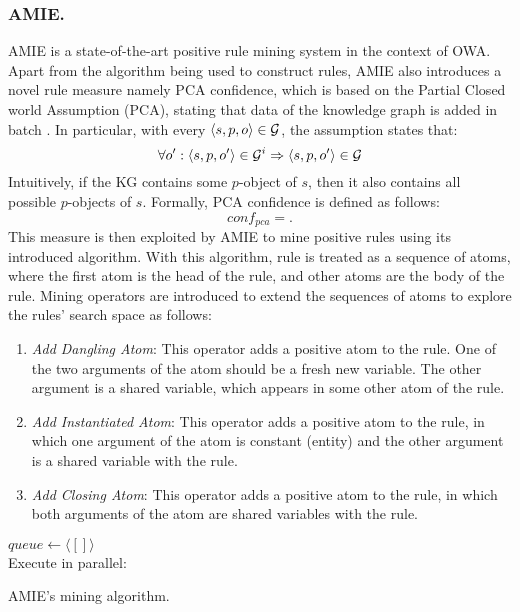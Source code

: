 \subsubsection{AMIE.}
AMIE \cite{amie} is a state-of-the-art positive rule mining system in the context of OWA. Apart from the algorithm being used to construct rules, AMIE also introduces a novel rule measure namely PCA confidence, which is based on the Partial Closed world Assumption (PCA), stating that data of the knowledge graph is added in batch \cite{amie}. In particular, with every $\langle s,p,o\rangle \in \mathcal{G}$, the assumption states that:
\[\forall o' : \langle s,p,o'\rangle \in \mathcal{G}^i \Rightarrow \langle s,p,o'\rangle \in \mathcal{G}\]
Intuitively, if the KG contains some $p$-object of $s$, then it also contains all possible $p$-objects of $s$. Formally, PCA confidence is defined as follows:
\[conf_{pca}=.\]
This measure is then exploited by AMIE to mine positive rules using its introduced algorithm. With this algorithm, rule is treated as a sequence of atoms, where the first atom is the head of the rule, and other atoms are the body of the rule. Mining operators are introduced to extend the sequences of atoms to explore the rules' search space as follows:
\begin{enumerate}
\item \textit{Add Dangling Atom}: This operator adds a positive atom to the rule. One of the two arguments of the atom should be a fresh new variable. The other argument is a shared variable, which appears in some other atom of the rule.
\item \textit{Add Instantiated Atom}: This operator adds a positive atom to the rule, in which one argument of the atom is constant (entity) and the other argument is a shared variable with the rule.
\item \textit{Add Closing Atom}: This operator adds a positive atom to the rule, in which both arguments of the atom are shared variables with the rule.
\end{enumerate}
\begin{algorithm}[H]
\DontPrintSemicolon
$queue\leftarrow \langle[]\rangle$\\
Execute in parallel:\\
\caption{AMIE's mining algorithm.}
\label{algor:amie}
\end{algorithm}
